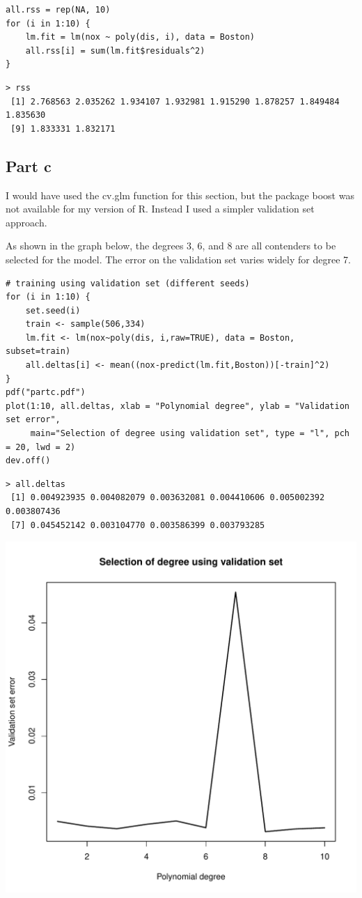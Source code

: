 \documentclass[11pt, a4paper]{article}
\begin{document}
\begin{verbatim}
all.rss = rep(NA, 10)
for (i in 1:10) {
    lm.fit = lm(nox ~ poly(dis, i), data = Boston)
    all.rss[i] = sum(lm.fit$residuals^2)
}
\end{verbatim}


\begin{verbatim}
> rss
 [1] 2.768563 2.035262 1.934107 1.932981 1.915290 1.878257 1.849484 1.835630
 [9] 1.833331 1.832171
\end{verbatim}
\subsection{Part c}
\label{sec-2-3}


I would have used the cv.glm function for this section, but the
package boost was not available for my version of R. Instead I used a
simpler validation set approach.

As shown in the graph below, the degrees 3, 6, and 8 are all
contenders to be selected for the model. The error on the validation
set varies widely for degree 7.


\begin{verbatim}
# training using validation set (different seeds)
for (i in 1:10) {
    set.seed(i)
    train <- sample(506,334)
    lm.fit <- lm(nox~poly(dis, i,raw=TRUE), data = Boston, subset=train)
    all.deltas[i] <- mean((nox-predict(lm.fit,Boston))[-train]^2)
}
pdf("partc.pdf")
plot(1:10, all.deltas, xlab = "Polynomial degree", ylab = "Validation set error",
     main="Selection of degree using validation set", type = "l", pch = 20, lwd = 2)
dev.off()
\end{verbatim}


\begin{verbatim}
> all.deltas
 [1] 0.004923935 0.004082079 0.003632081 0.004410606 0.005002392 0.003807436
 [7] 0.045452142 0.003104770 0.003586399 0.003793285
\end{verbatim}

\includegraphics[scale=0.6]{partc.pdf}
\end{document}
